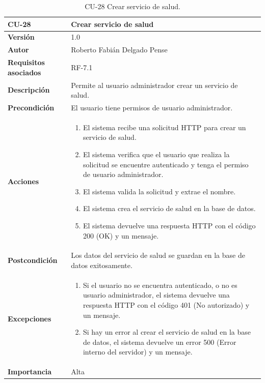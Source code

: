 \begin{table}[p]
	\centering
	\begin{tabularx}{\linewidth}{ p{} p{} }
		\toprule
		\textbf{CU-28}    & \textbf{Crear servicio de salud}\\
		\toprule
		\textbf{Versión}              & 1.0    \\
		\textbf{Autor}                & Roberto Fabián Delgado Pense \\
		\textbf{Requisitos asociados} & RF-7.1 \\ 
		\textbf{Descripción}          & Permite al usuario administrador crear un servicio de salud. \\
		\textbf{Precondición}         & El usuario tiene permisos de usuario administrador. \\
		\textbf{Acciones}             &
		\begin{enumerate}
			\def\labelenumi{\arabic{enumi}.}
			\tightlist
			\item El sistema recibe una solicitud HTTP para crear un servicio de salud.
                \item El sistema verifica que el usuario que realiza la solicitud se encuentre autenticado y tenga el permiso de usuario administrador.
			\item El sistema valida la solicitud y extrae el nombre.
                 \item El sistema crea el servicio de salud en la base de datos.
                \item El sistema devuelve una respuesta HTTP con el código 200 (OK) y un mensaje.
            \end{enumerate}\\
		\textbf{Postcondición}        & Los datos del servicio de salud se guardan en la base de datos exitosamente.\\
		\textbf{Excepciones}          & 
            \begin{enumerate}
			\def\labelenumi{\arabic{enumi}.}
			\tightlist
   			\item Si el usuario no se encuentra autenticado, o no es usuario administrador, el sistema devuelve una                 respuesta HTTP con el código 401 (No autorizado) y un mensaje.
                \item   Si hay un error al crear  el servicio de salud en la base de datos, el sistema devuelve un error 500 (Error interno del servidor) y un mensaje.
            \end{enumerate}\\
		\textbf{Importancia}          & Alta \\
		\bottomrule
	\end{tabularx}
	\caption{CU-28 Crear servicio de salud.}
\end{table}

